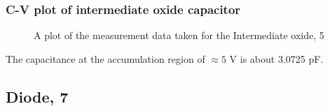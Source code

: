 \documentclass{article}
\begin{document}
\subsubsection{C-V plot of intermediate oxide capacitor}
\begin{figure}[H]
\centering
{}
\caption{A plot of the measurement data taken for the Intermediate oxide, 5}
\end{figure}

The capacitance at the accumulation region of $\approx 5$ V is about 3.0725 pF.


\subsection{Diode, 7} %
\end{document}
